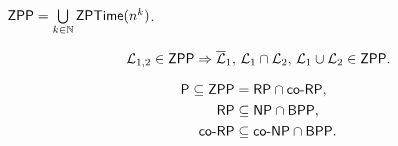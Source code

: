 		\begin{defn}
			$\mathsf{ZPP} = \bigcup\limits_{k\in\mathbb{N}} \mathsf{ZPTime}(n^k)$.
		\end{defn}
		
		\begin{thm}
			\begin{equation*}
				{\cal L}_{1,2}\in\mathsf{ZPP}\Rightarrow{\cal\overline L}_1,\,{\cal L}_1\cap{\cal L}_2,\,{\cal L}_1\cup{\cal L}_2\in\mathsf{ZPP} .
			\end{equation*}
		\end{thm}
		
		\begin{thm}
			\begin{align*}
				\mathsf{P} \subseteq \mathsf{ZPP} &= \mathsf{RP} \cap \mathsf{co}\textnormal{-}\mathsf{RP} , \\
				\mathsf{RP} &\subseteq \mathsf{NP}\cap\mathsf{BPP} , \\
				\mathsf{co}\textnormal{-}\mathsf{RP} &\subseteq \mathsf{co}\textnormal{-}\mathsf{NP}\cap\mathsf{BPP} .
			\end{align*}
		\end{thm}
		
		
